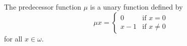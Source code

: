 The predecessor function $\mu$ is a unary function defined by
$$\mu x = \begin{cases} 0 & \text{if } x=0 \\ x-1 & \text{if } x\neq 0 \end{cases}$$
for all $x\in\omega$.
